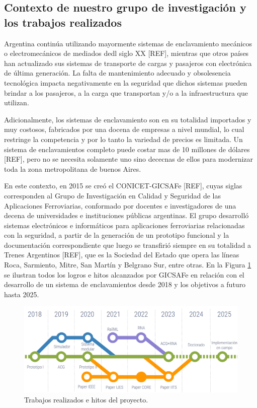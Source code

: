 \subsection{Contexto de nuestro grupo de investigación y los trabajos realizados}

    Argentina continúa utilizando mayormente sistemas de enclavamiento mecánicos o electromecánicos de mediados dedl siglo XX [REF], mientras que otros países han actualizado sus sistemas de transporte de cargas y pasajeros con electrónica de última generación. La falta de mantenimiento adecuado y obsolesencia tecnológica impacta negativamente en la seguridad que dichos sistemas pueden brindar a los pasajeros, a la carga que transportan y/o a la infraestructura que utilizan.

    Adicionalmente, los sistemas de enclavamiento son en su totalidad importados y muy costosos, fabricados por una docena de empresas a nivel mundial, lo cual restringe la competencia y por lo tanto la variedad de precios es limitada. Un sistema de enclavamientos completo puede costar mas de 10 millones de dólares [REF], pero no se necesita solamente uno sino dececnas de ellos para modernizar toda la zona metropolitana de buenos Aires.

    En este contexto, en 2015 se creó el CONICET-GICSAFe [REF], cuyas siglas corresponden al Grupo de Investigación en Calidad y Seguridad de las Aplicaciones Ferroviarias, conformado por docentes e investigadores de una decena de universidades e instituciones públicas argentinas. El grupo desarrolló sistemas electrónicos e informáticos para aplicaciones ferroviarias relacionadas con la seguridad, a partir de la generación de un prototipo funcional y la documentación correspondiente que luego se transfirió siempre en su totalidad a Trenes Argentinos [REF], que es la Sociedad del Estado que opera las líneas Roca, Sarmiento, Mitre, San Martín y Belgrano Sur, entre otras. En la Figura \ref{fig:contexto} se ilustran todos los logros e hitos alcanzados por GICSAFe en relación con el desarrollo de un sistema de enclavamientos desde 2018 y los objetivos a futuro hasta 2025.

    \begin{figure}[h]
        \centering
        \includegraphics[width=1\textwidth]{Figuras/HojaDeRuta}
        \centering\caption{Trabajos realizados e hitos del proyecto.}
        \label{fig:contexto}
    \end{figure}

